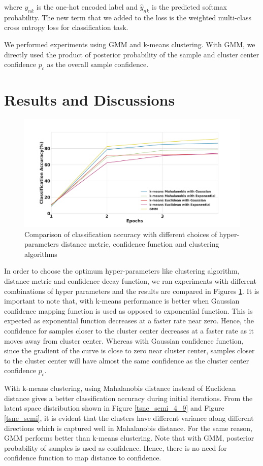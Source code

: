 \documentclass[runningheads]{llncs}
\begin{document}
where $y_{nk}$ is the one-hot encoded label and $\hat{y}_{nk}$ is the predicted softmax probability.
The new term that we added to the loss is the weighted multi-class cross entropy loss for classification task.


We performed experiments using GMM and k-means clustering.
With GMM, we directly used the product of posterior probability of the sample and cluster center confidence $p_c$ as the overall sample confidence.


\section{Results and Discussions}

\begin{figure}[!t]
\centering
  \centering
  \includegraphics[width=.7\linewidth]{images/classification_accuracy_hyperparameter}
\caption{Comparison of classification accuracy with different choices of hyper-parameters distance metric, confidence function and clustering algorithms}
\label{classification_acc}
\end{figure}

In order to choose the optimum hyper-parameters like clustering algorithm, distance metric and confidence decay function, we ran experiments with different combinations of hyper parameters and the results are compared in Figures \ref{classification_acc}.
It is important to note that, with k-means performance is better when Gaussian confidence mapping function is used as opposed to exponential function.
This is expected as exponential function decreases at a faster rate near zero.
Hence, the confidence for samples closer to the cluster center decreases at a faster rate as it moves away from cluster center.
Whereas  with Gaussian confidence function, since the gradient of the curve is close to zero near cluster center, samples closer to the cluster center will have almost the same confidence as the cluster center confidence $p_c$.


With k-means clustering, using Mahalanobis distance instead of Euclidean distance gives a better classification accuracy during initial iterations.
From the latent space distribution shown in Figure \ref{tsne_semi_4_9} and Figure \ref{tsne_semi}, it is evident that the clusters have different variance along different directions which is captured well in Mahalanobis distance.
For the same reason, GMM performs better than k-means clustering.
Note that with GMM, posterior probability of samples is used as confidence.
Hence, there is no need for confidence function to map distance to confidence.
\end{document}
